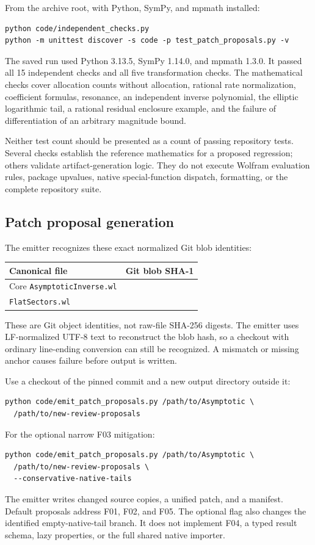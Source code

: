 From the archive root, with Python, SymPy, and mpmath installed:
\begin{lstlisting}
python code/independent_checks.py
python -m unittest discover -s code -p test_patch_proposals.py -v
\end{lstlisting}
The saved run used Python 3.13.5, SymPy 1.14.0, and mpmath 1.3.0. It passed all 15 independent checks and all five transformation checks. The mathematical checks cover allocation counts without allocation, rational rate normalization, coefficient formulas, resonance, an independent inverse polynomial, the elliptic logarithmic tail, a rational residual enclosure example, and the failure of differentiation of an arbitrary magnitude bound.

Neither test count should be presented as a count of passing repository tests. Several checks establish the reference mathematics for a proposed regression; others validate artifact-generation logic. They do not execute Wolfram evaluation rules, package upvalues, native special-function dispatch, formatting, or the complete repository suite.

\subsection{Patch proposal generation}

The emitter recognizes these exact normalized Git blob identities:
\begin{center}
\begin{tabular}{@{}P{5.7cm}P{9.2cm}@{}}
\toprule Canonical file & Git blob SHA-1\\\midrule
Core \texttt{AsymptoticInverse.wl} & \\
\texttt{FlatSectors.wl} & \\
\bottomrule
\end{tabular}
\end{center}
These are Git object identities, not raw-file SHA-256 digests. The emitter uses LF-normalized UTF-8 text to reconstruct the blob hash, so a checkout with ordinary line-ending conversion can still be recognized. A mismatch or missing anchor causes failure before output is written.

Use a checkout of the pinned commit and a new output directory outside it:
\begin{lstlisting}
python code/emit_patch_proposals.py /path/to/Asymptotic \
  /path/to/new-review-proposals
\end{lstlisting}
For the optional narrow F03 mitigation:
\begin{lstlisting}
python code/emit_patch_proposals.py /path/to/Asymptotic \
  /path/to/new-review-proposals \
  --conservative-native-tails
\end{lstlisting}
The emitter writes changed source copies, a unified patch, and a manifest. Default proposals address F01, F02, and F05. The optional flag also changes the identified empty-native-tail branch. It does not implement F04, a typed result schema, lazy properties, or the full shared native importer.

